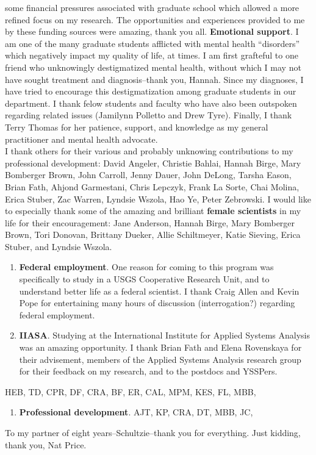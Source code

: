 \documentclass[12pt,twoside]{reedthesis}
\providecommand{\tightlist}{%
  \setlength{\itemsep}{0pt}\setlength{\parskip}{0pt}}
\def\labelenumi{\arabic{enumi}.}
\def\labelenumi{\arabic{enumi}.}
\begin{document}
\begin{acknowledgements}
    some financial pressures associated with graduate school which allowed a
    more refined focus on my research. The opportunities and experiences
    provided to me by these funding sources were amazing, thank you all.
    \textbf{Emotional support}. I am one of the many graduate students
    afflicted with mental health ``disorders'' which negatively impact my
    quality of life, at times. I am first grafteful to one friend who
    unknowingly destigmatized mental health, without which I may not have
    sought treatment and diagnosis--thank you, Hannah. Since my diagnoses, I
    have tried to encourage this destigmatization among graduate students in
    our department. I thank felow students and faculty who have also been
    outspoken regarding related issues (Jamilynn Polletto and Drew Tyre).
    Finally, I thank Terry Thomas for her patience, support, and knowledge
    as my general practitioner and mental health advocate.\\
    I thank others for their various and probably unknowing contributions to
    my professional development: David Angeler, Christie Bahlai, Hannah
    Birge, Mary Bomberger Brown, John Carroll, Jenny Dauer, John DeLong,
    Tarsha Eason, Brian Fath, Ahjond Garmestani, Chris Lepczyk, Frank La
    Sorte, Chai Molina, Erica Stuber, Zac Warren, Lyndsie Wszola, Hao Ye,
    Peter Zebrowski. I would like to especially thank some of the amazing
    and brilliant \textbf{female scientists} in my life for their
    encouragement: Jane Anderson, Hannah Birge, Mary Bomberger Brown, Tori
    Donovan, Brittany Dueker, Allie Schiltmeyer, Katie Sieving, Erica
    Stuber, and Lyndsie Wszola.
    \begin{enumerate}
    \def\labelenumi{\arabic{enumi}.}
    \item
      \textbf{Federal employment}. One reason for coming to this program was
      specifically to study in a USGS Cooperative Research Unit, and to
      understand better life as a federal scientist. I thank Craig Allen and
      Kevin Pope for entertaining many hours of discussion (interrogation?)
      regarding federal employment.
    \item
      \textbf{IIASA}. Studying at the International Institute for Applied
      Systems Analysis was an amazing opportunity. I thank Brian Fath and
      Elena Rovenskaya for their advisement, members of the Applied Systems
      Analysis research group for their feedback on my research, and to the
      postdocs and YSSPers.
    \end{enumerate}
    HEB, TD, CPR, DF, CRA, BF, ER, CAL, MPM, KES, FL, MBB,
    \begin{enumerate}
    \def\labelenumi{\arabic{enumi}.}
    \tightlist
    \item
      \textbf{Professional development}. AJT, KP, CRA, DT, MBB, JC,
    \end{enumerate}
    To my partner of eight years--Schultzie--thank you for everything. Just
    kidding, thank you, Nat Price.
  \end{acknowledgements}
\end{document}
